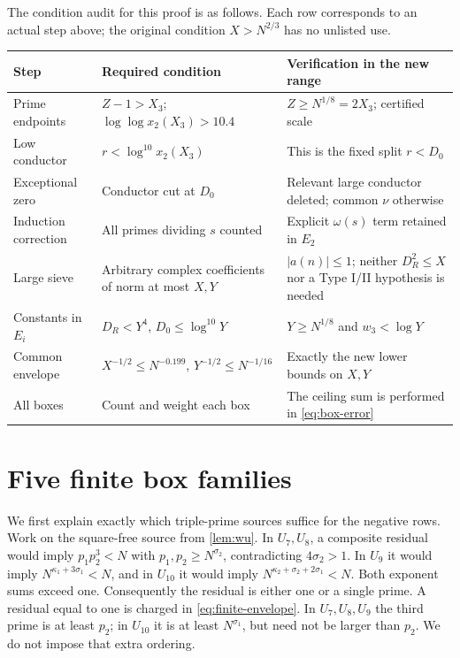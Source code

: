 \documentclass[11pt]{article}
\theoremstyle{definition}
\begin{document}
The condition audit for this proof is as follows.  Each row corresponds
to an actual step above; the original condition $X>N^{2/3}$ has no
unlisted use.
\begin{center}
\small
\begin{tabularx}{\textwidth}{@{}>{\raggedright\arraybackslash}p{}
  >{\raggedright\arraybackslash}X>{\raggedright\arraybackslash}X@{}}
\toprule
Step & Required condition & Verification in the new range\\
\midrule
Prime endpoints & $Z-1>X_3$; $\log\log x_2(X_3)>10.4$
 & $Z\ge N^{1/8}=2X_3$; certified scale\\
Low conductor & $r<\log^{10}x_2(X_3)$
 & This is the fixed split $r<D_0$\\
Exceptional zero & Conductor cut at $D_0$
 & Relevant large conductor deleted; common $\nu$ otherwise\\
Induction correction & All primes dividing $s$ counted
 & Explicit $\omega(s)$ term retained in $E_2$\\
Large sieve & Arbitrary complex coefficients of norm at most $X,Y$
 & $|a(n)|\le1$; neither $D_R^2\le X$ nor a Type I/II hypothesis is needed\\
Constants in $E_i$ & $D_R<Y^4$, $D_0\le\log^{10}Y$
 & $Y\ge N^{1/8}$ and $w_3<\log Y$\\
Common envelope & $X^{-1/2}\le N^{-0.199}$, $Y^{-1/2}\le N^{-1/16}$
 & Exactly the new lower bounds on $X,Y$\\
All boxes & Count and weight each box
 & The ceiling sum is performed in \eqref{eq:box-error}\\
\bottomrule
\end{tabularx}
\end{center}

\section{Five finite box families}\label{sec:boxes}

We first explain exactly which triple-prime sources suffice for the
negative rows.  Work on the square-free source from \cref{lem:wu}.
In $U_7,U_8$, a composite residual would imply $p_1p_2^3<N$ with
$p_1,p_2\ge N^{\sigma_2}$, contradicting $4\sigma_2>1$.
In $U_9$ it would imply $N^{\kappa_1+3\sigma_1}<N$, and in
$U_{10}$ it would imply $N^{\kappa_2+\sigma_2+2\sigma_1}<N$.
Both exponent sums exceed one.  Consequently the residual is either
one or a single prime.  A residual equal to one is charged in
\cref{eq:finite-envelope}.  In $U_7,U_8,U_9$ the third prime is at least
$p_2$; in $U_{10}$ it is at least $N^{\sigma_1}$, but need not be
larger than $p_2$.  We do not impose that extra ordering.
\end{document}
